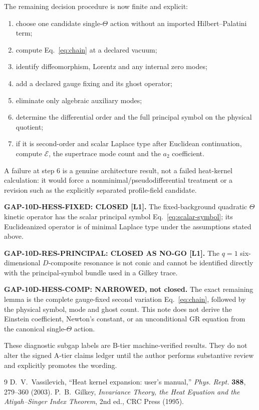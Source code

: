 \documentclass[11pt,a4paper]{article}
\begin{document}
The remaining decision procedure is now finite and explicit:
\begin{enumerate}
 \item choose one candidate single-$\Theta$ action without an imported
 Hilbert--Palatini term;
 \item compute Eq.~\eqref{eq:chain} at a declared vacuum;
 \item identify diffeomorphism, Lorentz and any internal zero modes;
 \item add a declared gauge fixing and its ghost operator;
 \item eliminate only algebraic auxiliary modes;
 \item determine the differential order and the full principal symbol on the
 physical quotient;
 \item if it is second-order and scalar Laplace type after Euclidean
 continuation, compute $\mathcal E$, the supertrace mode count and the
 $a_2$ coefficient.
\end{enumerate}
A failure at step 6 is a genuine architecture result, not a failed heat-kernel
calculation: it would force a nonminimal/pseudodifferential treatment or a
revision such as the explicitly separated profile-field candidate.

\begin{tcolorbox}[colback=green!6!white,colframe=green!55!black,
title=Machine-verified B-tier status]
\textbf{GAP-10D-HESS-FIXED: CLOSED [L1].}
The fixed-background quadratic $\Theta$ kinetic operator has the scalar
principal symbol Eq.~\eqref{eq:scalar-symbol}; its Euclideanized operator is
of minimal Laplace type under the assumptions stated above.

\medskip
\textbf{GAP-10D-RES-PRINCIPAL: CLOSED AS NO-GO [L1].}
The $q=1$ six-dimensional $D$-composite resonance is not conic and cannot be
identified directly with the principal-symbol bundle used in a Gilkey trace.

\medskip
\textbf{GAP-10D-HESS-COMP: NARROWED, not closed.}
The exact remaining lemma is the complete gauge-fixed second variation
Eq.~\eqref{eq:chain}, followed by the physical symbol, mode and ghost count.
This note does not derive the Einstein coefficient, Newton's constant, or an
unconditional GR equation from the canonical single-$\Theta$ action.

\medskip
These diagnostic subgap labels are B-tier machine-verified results.  They do
not alter the signed A-tier claims ledger until the author performs substantive
review and explicitly promotes the wording.
\end{tcolorbox}

\begin{thebibliography}{9}
D.~V.~Vassilevich, ``Heat kernel expansion: user's manual,''
\emph{Phys. Rept.} \textbf{388}, 279--360 (2003).
P.~B.~Gilkey, \emph{Invariance Theory, the Heat Equation and the
Atiyah--Singer Index Theorem}, 2nd ed., CRC Press (1995).
\end{thebibliography}
\end{document}
